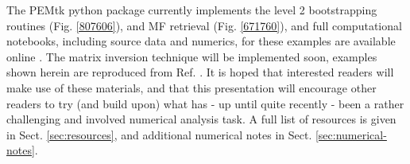 \documentclass[10pt]{article}
\begin{document}

The PEMtk python package \cite{hockett2021PEMtkDocs, hockett2021PEMtkGithub} currently implements the level 2 bootstrapping routines (Fig. \ref{807606}), and MF retrieval (Fig. \ref{671760}), and full computational notebooks, including source data and numerics, for these examples are available online \cite{hockett2022MFreconFigshare}. The matrix inversion technique will be implemented soon, examples shown herein are reproduced from Ref. \cite{gregory2021MolecularFramePhotoelectron}. It is hoped that interested readers will make use of these materials, and that this presentation will encourage other readers to try (and build upon) what has - up until quite recently - been a rather challenging and involved numerical analysis task. A full list of resources is given in Sect. \ref{sec:resources}, and additional numerical notes in Sect. \ref{sec:numerical-notes}.
\end{document}
